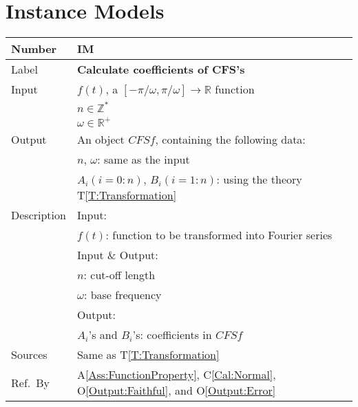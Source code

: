 \documentclass[12pt]{article}
\newcommand{\colAwidth}{0.13\textwidth}
\newcommand{\colBwidth}{0.82\textwidth}
\newcommand{\tref}[1]{T\ref{#1}}
\newcounter{instnum} %
\newcommand{\aref}[1]{A\ref{#1}}
\newcommand{\calref}[1]{C\ref{#1}}
\newcommand{\oref}[1]{O\ref{#1}}
\begin{document}
\section{Instance Models}
\label{Sc:IM}
\noindent
\begin{minipage}{\textwidth}
	\renewcommand*{\arraystretch}{1.5}
	\begin{tabular}{| p{\colAwidth} | p{\colBwidth}|}
		\hline
		\rowcolor[gray]{0.9}
		Number& IM{instnum}\theinstnum 
		\label{IM:CFScoeff}\\
		\hline
		Label& \bf Calculate coefficients of CFS's\\
		\hline
		Input& $f(t)$, a $[-\pi/\omega, \pi/\omega]
		\rightarrow\mathbb{R}$ function\\
		& $n\in\mathbb{Z}^{*}$\\
		& $\omega\in\mathbb{R}^{+}$\\
		\hline
		Output& An object $\mathit{CFSf}$, containing the 
		following data:\\
		&$n$, $\omega$: same as the input\\
		&$A_i (i=0:n)$, $B_i (i=1:n)$: using the theory 
		\tref{T:Transformation}\\
		\hline
		Description&Input:\\
		&$f(t)$: function to be transformed into 
		Fourier series\\
		&Input \& Output:\\
		& $n$: cut-off length\\
		& $\omega$: base frequency\\
		&Output:\\
		&$A_i$'s and $B_i$'s: coefficients in $\mathit{CFSf}$\\
		\hline
		Sources&Same as \tref{T:Transformation}		\\
		\hline
		Ref.\ By & \aref{Ass:FunctionProperty}, 
		\calref{Cal:Normal}, 
		\oref{Output:Faithful}, and \oref{Output:Error}\\
		\hline
	\end{tabular}
\end{minipage}\\
~\newline
\end{document}
